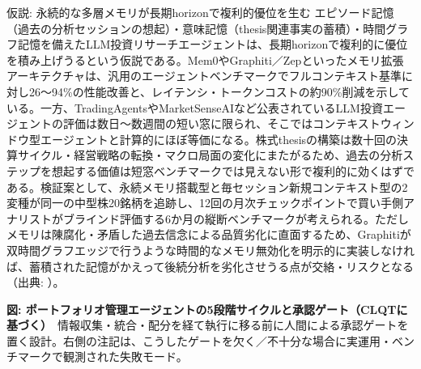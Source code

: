 \begin{insight}{仮説: 永続的な多層メモリが長期horizonで複利的優位を生む}
エピソード記憶（過去の分析セッションの想起）・意味記憶（thesis関連事実の蓄積）・時間グラフ記憶を備えたLLM投資リサーチエージェントは、長期horizonで複利的に優位を積み上げうるという仮説である。Mem0やGraphiti／Zepといったメモリ拡張アーキテクチャは、汎用のエージェントベンチマークでフルコンテキスト基準に対し26〜94\%の性能改善と、レイテンシ・トークンコストの約90\%削減を示している。一方、TradingAgentsやMarketSenseAIなど公表されているLLM投資エージェントの評価は数日〜数週間の短い窓に限られ、そこではコンテキストウィンドウ型エージェントと計算的にほぼ等価になる。株式thesisの構築は数十回の決算サイクル・経営戦略の転換・マクロ局面の変化にまたがるため、過去の分析ステップを想起する価値は短窓ベンチマークでは見えない形で複利的に効くはずである。検証案として、永続メモリ搭載型と毎セッション新規コンテキスト型の2変種が同一の中型株20銘柄を追跡し、12回の月次チェックポイントで買い手側アナリストがブラインド評価する6か月の縦断ベンチマークが考えられる。ただしメモリは陳腐化・矛盾した過去信念による品質劣化に直面するため、Graphitiが双時間グラフエッジで行うような時間的なメモリ無効化を明示的に実装しなければ、蓄積された記憶がかえって後続分析を劣化させうる点が交絡・リスクとなる（出典: \cite{mem0_2025}）。
\end{insight}

\begin{center}

\vspace{1mm}
{\small\color{figgray}\textbf{図: ポートフォリオ管理エージェントの5段階サイクルと承認ゲート（CLQTに基づく）}\
情報収集・統合・配分を経て執行に移る前に人間による承認ゲートを置く設計。右側の注記は、こうしたゲートを欠く／不十分な場合に実運用・ベンチマークで観測された失敗モード。}
\end{center}

